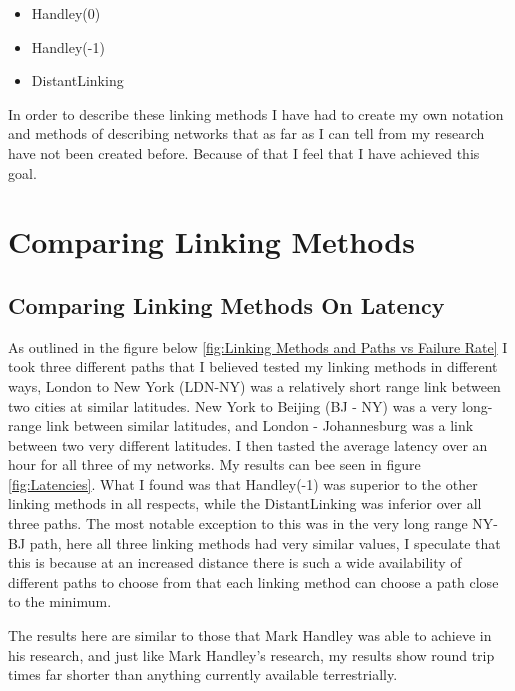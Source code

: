 \documentclass[12pt,a4paper,twoside,openright]{report}
\begin{document}
\begin{itemize}
\item Handley(0)
\item Handley(-1)
\item DistantLinking
\end{itemize}

In order to describe these linking methods I have had to create my own notation and methods of describing networks that as far as I can tell from my research have not been created before. Because of that I feel that I have achieved this goal.

\section{Comparing Linking Methods}

\subsection{Comparing Linking Methods On Latency}

As outlined in the figure below \ref{fig:Linking Methods and Paths vs Failure Rate} I took three different paths that I believed tested my linking methods in different ways, London to New York (LDN-NY) was a relatively short range link between two cities at similar latitudes. New York to Beijing (BJ - NY) was a very long-range link between similar latitudes, and London - Johannesburg was a link between two very different latitudes. I then tasted the average latency over an hour for all three of my networks. My results can bee seen in figure \ref{fig:Latencies}. What I found was that Handley(-1) was superior to the other linking methods in all respects, while the DistantLinking was inferior over all three paths. The most notable exception to this was in the very long range NY-BJ path, here all three linking methods had very similar values, I speculate that this is because at an increased distance there is such a wide availability of different paths to choose from that each linking method can choose a path close to the minimum.

The results here are similar to those that Mark Handley was able to achieve in his research, and just like Mark Handley's research, my results show round trip times far shorter than anything currently available terrestrially. 
\end{document}

